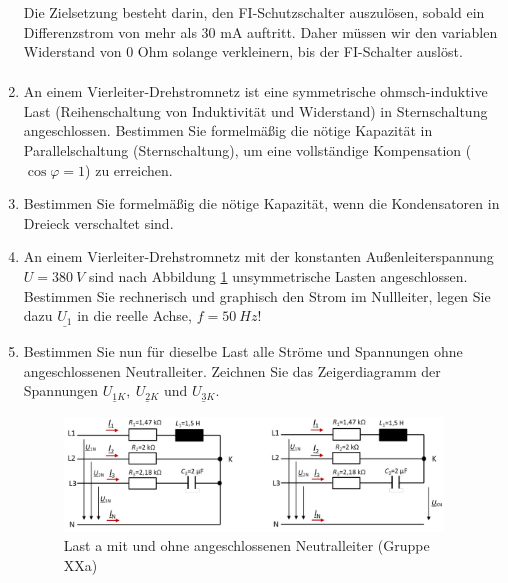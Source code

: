 \begin{enumerate}[label=\alph*)]
	Die Zielsetzung besteht darin, den FI-Schutzschalter auszulösen, sobald ein Differenzstrom von mehr als 30 mA auftritt. Daher müssen wir den variablen Widerstand von 0 Ohm solange verkleinern, bis der FI-Schalter auslöst.
\begin{align*}
  
\end{align*}
  \item An einem Vierleiter-Drehstromnetz ist eine symmetrische ohmsch-induktive Last (Reihenschaltung von Induktivität und Widerstand) in Sternschaltung angeschlossen. Bestimmen Sie formelmäßig die nötige Kapazität in Parallelschaltung (Sternschaltung), um eine vollständige Kompensation ($\cos \varphi = 1$) zu erreichen. 


  \item Bestimmen Sie formelmäßig die nötige Kapazität, wenn die Kondensatoren in Dreieck verschaltet sind.

  \item An einem Vierleiter-Drehstromnetz mit der konstanten Außenleiterspannung $U = 380\ V$ sind nach Abbildung \ref{img2.6.1} unsymmetrische Lasten angeschlossen. Bestimmen Sie rechnerisch und graphisch den Strom im Nullleiter, legen Sie dazu $\underline{U_1}$ in die reelle Achse, $f = 50\ Hz$!

\item Bestimmen Sie nun für dieselbe Last alle Ströme und Spannungen ohne angeschlossenen Neutralleiter. Zeichnen Sie das Zeigerdiagramm der Spannungen $\underline{U_{1K}},\ \underline{U_{2K}} \text{ und } \underline{U_{3K}}$. 
  \begin{figure}[h!]
    \begin{center}
      \includegraphics[width=0.95\textwidth]{img/img2.6.1.png}
    \end{center}
    \caption{Last a mit und ohne angeschlossenen Neutralleiter (Gruppe XXa)}\label{img2.6.1}
  \end{figure}
  
\end{enumerate}
